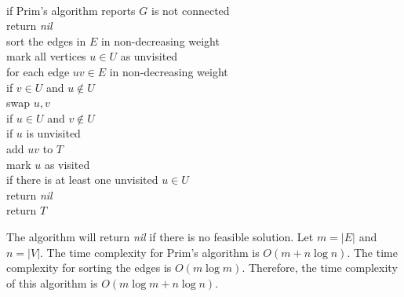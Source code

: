 \documentclass[11pt]{article}
\begin{document}
\begin{solution}
\begin{enumerate}[(a)]
\begin{algo}
\\	if Prim's algorithm reports $G$ is not connected\+
\\	return \emph{nil}\-
\\	sort the edges in $E$ in non-decreasing weight
\\	mark all vertices $u\in U$ as unvisited
\\	for each edge $uv\in E$ in non-decreasing weight\+
\\	if $v\in U$ and $u\notin U$\+
\\	swap $u,v$\-
\\	if $u\in U$ and $v\notin U$\+
\\	if $u$ is unvisited\+
\\	add $uv$ to $T$
\\	mark $u$ as visited\-\-\-
\\	if there is at least one unvisited $u\in U$\+
\\	return \emph{nil}\-
\\	return $T$
\end{algo}
The algorithm will return \emph{nil} if there is no feasible solution. Let $m=|E|$ and $n=|V|$. The time complexity for Prim's algorithm is $O(m+n\log{n})$. The time complexity for sorting the edges is $O(m\log{m})$. Therefore, the time complexity of this algorithm is $O(m\log{m}+n\log{n})$.
\end{enumerate}
\end{solution}

\end{document}
